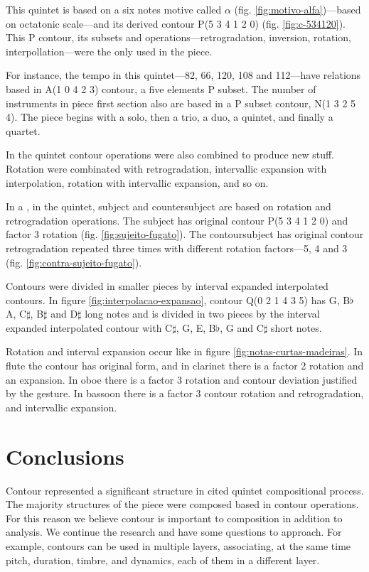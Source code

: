 This quintet is based on a six notes motive called $\alpha$
(fig. \ref{fig:motivo-alfa})---based on octatonic scale---and its
derived contour P(5 3 4 1 2 0) (fig. \ref{fig:c-534120}). This P
contour, its subsets and operations---retrogradation, inversion,
rotation, interpollation---were the only used in the piece.

For instance, the tempo in this quintet---82, 66, 120, 108 and
112---have relations based in A(1 0 4 2 3) contour, a five elements P
subset. The number of instruments in piece first section also are
based in a P subset contour, N(1 3 2 5 4). The piece begins with a
solo, then a trio, a duo, a quintet, and finally a quartet.

In the quintet contour operations were also combined to produce new
stuff. Rotation were combinated with retrogradation, intervallic
expansion with interpolation, rotation with intervallic expansion, and
so on.

In a , in the quintet, subject and countersubject are based
on rotation and retrogradation operations. The subject has original
contour P(5 3 4 1 2 0) and factor 3 rotation
(fig. \ref{fig:sujeito-fugato}). The contoursubject has original
contour retrogradation repeated three times with different rotation
factors---5, 4 and 3 (fig. \ref{fig:contra-sujeito-fugato}).

Contours were divided in smaller pieces by interval expanded
interpolated contours. In figure \ref{fig:interpolacao-expansao},
contour Q(0 2 1 4 3 5) has G, B$\flat$ A, C$\sharp$, B$\sharp$ and
D$\sharp$ long notes and is divided in two pieces by the interval
expanded interpolated contour with C$\sharp$, G, E, B$\flat$, G and
C$\sharp$ short notes.

Rotation and interval expansion occur like in figure
\ref{fig:notas-curtas-madeiras}. In flute the contour has original
form, and in clarinet there is a factor 2 rotation and an
expansion. In oboe there is a factor 3 rotation and contour deviation
justified by the gesture. In bassoon there is a factor 3 contour
rotation and retrogradation, and intervallic expansion.

\section{Conclusions}
\label{sec:conclusions}

Contour represented a significant structure in cited quintet
compositional process. The majority structures of the piece were
composed based in contour operations. For this reason we believe
contour is important to composition in addition to analysis. We
continue the research and have some questions to approach. For
example, contours can be used in multiple layers, associating, at the
same time pitch, duration, timbre, and dynamics, each of them in a
different layer.

